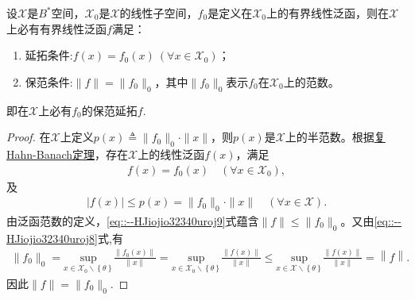 \documentclass[../../main.tex]{subfiles}%
\begin{document}
\begin{theorem}\label{theorem:泛函分析--(哈恩-巴拿赫)Hahn-Banach定理}
设$\mathscr{X}$是$B^*$空间，$\mathscr{X}_0$是$\mathscr{X}$的线性子空间，$f_0$是定义在$\mathscr{X}_0$上的有界线性泛函，则在$\mathscr{X}$上必有有界线性泛函$f$满足：
\begin{enumerate}[(1)]
\item 延拓条件:$f(x) = f_0(x) \ (\forall x \in \mathscr{X}_0)$；
\item 保范条件:$\|f\| = \|f_0\|_0$，其中$\|f_0\|_0$表示$f_0$在$\mathscr{X}_0$上的范数。
\end{enumerate}
即在$\mathscr{X}$上必有$f_0$的保范延拓$f$.
\end{theorem}
\begin{proof}
在$\mathscr{X}$上定义$p(x) \triangleq \|f_0\|_0 \cdot \|x\|$，则$p(x)$是$\mathscr{X}$上的半范数。根据\hyperref[theorem:泛函分析--复Hahn-Banach定理]{复Hahn-Banach定理}，存在$\mathscr{X}$上的线性泛函$f(x)$，满足
\begin{align}
f(x) = f_0(x) \quad (\forall x \in \mathscr{X}_0), \label{eq::--HJiojio32340uroj8}
\end{align}
及
\begin{align}
|f(x)| \leqslant p(x) = \|f_0\|_0 \cdot \|x\| \quad (\forall x \in \mathscr{X}). \label{eq::--HJiojio32340uroj9}
\end{align}
由泛函范数的定义，\eqref{eq::--HJiojio32340uroj9}式蕴含$\|f\| \leqslant \|f_0\|_0$。又由\eqref{eq::--HJiojio32340uroj8}式,有
\begin{align*}
\parallel f_0\parallel _0=\underset{x\in \mathscr{X} _0\backslash \left\{ \theta \right\}}{\mathrm{sup}}\frac{\left\| f_0\left( x \right) \right\|}{\left\| x \right\|}=\underset{x\in \mathscr{X} _0\backslash \left\{ \theta \right\}}{\mathrm{sup}}\frac{\left\| f\left( x \right) \right\|}{\left\| x \right\|}\leqslant \underset{x\in \mathscr{X} \backslash \left\{ \theta \right\}}{\mathrm{sup}}\frac{\left\| f\left( x \right) \right\|}{\left\| x \right\|}=\left\| f \right\| .
\end{align*}
因此$\|f\| = \|f_0\|_0$.
\end{proof}
\end{document}
